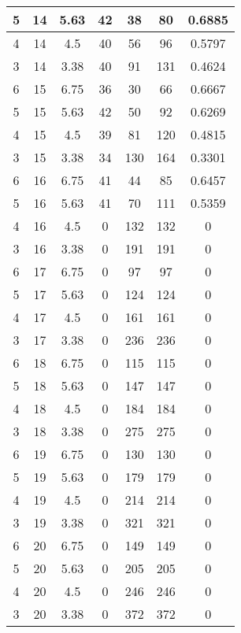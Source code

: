 \documentclass[letterpaper, 12pt]{article}
\begin{document}
\begin{longtable}{|c|c|c|c|c|c|c|}
\hline
5 & 14 & 5.63 & 42 & 38 & 80 & 0.6885 \\
\hline
4 & 14 & 4.5 & 40 & 56 & 96 & 0.5797 \\
\hline
3 & 14 & 3.38 & 40 & 91 & 131 & 0.4624 \\
\hline
6 & 15 & 6.75 & 36 & 30 & 66 & 0.6667 \\
\hline
5 & 15 & 5.63 & 42 & 50 & 92 & 0.6269 \\
\hline
4 & 15 & 4.5 & 39 & 81 & 120 & 0.4815 \\
\hline
3 & 15 & 3.38 & 34 & 130 & 164 & 0.3301 \\
\hline
6 & 16 & 6.75 & 41 & 44 & 85 & 0.6457 \\
\hline
5 & 16 & 5.63 & 41 & 70 & 111 & 0.5359 \\
\hline
4 & 16 & 4.5 & 0 & 132 & 132 & 0 \\
\hline
3 & 16 & 3.38 & 0 & 191 & 191 & 0 \\
\hline
6 & 17 & 6.75 & 0 & 97 & 97 & 0 \\
\hline
5 & 17 & 5.63 & 0 & 124 & 124 & 0 \\
\hline
4 & 17 & 4.5 & 0 & 161 & 161 & 0 \\
\hline
3 & 17 & 3.38 & 0 & 236 & 236 & 0 \\
\hline
6 & 18 & 6.75 & 0 & 115 & 115 & 0 \\
\hline
5 & 18 & 5.63 & 0 & 147 & 147 & 0 \\
\hline
4 & 18 & 4.5 & 0 & 184 & 184 & 0 \\
\hline
3 & 18 & 3.38 & 0 & 275 & 275 & 0 \\
\hline
6 & 19 & 6.75 & 0 & 130 & 130 & 0 \\
\hline
5 & 19 & 5.63 & 0 & 179 & 179 & 0 \\
\hline
4 & 19 & 4.5 & 0 & 214 & 214 & 0 \\
\hline
3 & 19 & 3.38 & 0 & 321 & 321 & 0 \\
\hline
6 & 20 & 6.75 & 0 & 149 & 149 & 0 \\
\hline
5 & 20 & 5.63 & 0 & 205 & 205 & 0 \\
\hline
4 & 20 & 4.5 & 0 & 246 & 246 & 0 \\
\hline
3 & 20 & 3.38 & 0 & 372 & 372 & 0 \\
\hline
\end{longtable}
\end{document}
